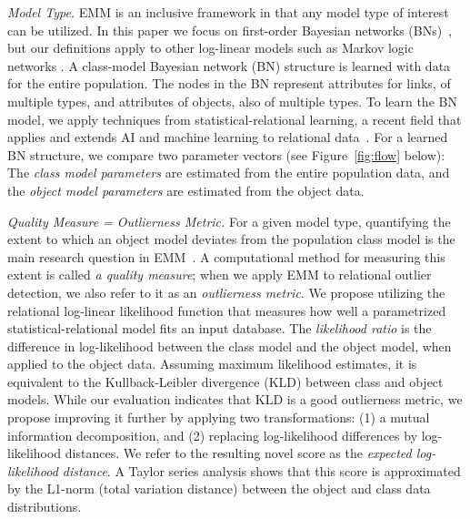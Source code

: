 {{\em Model Type.} EMM is an inclusive framework in that any model type of interest can be utilized. In this paper we focus on first-order Bayesian networks (BNs)~\cite{Wang2008,Poole2003,Kimmig2014}, but our definitions apply to other log-linear models such as Markov logic networks \cite{Domingos2007}. 
A class-model Bayesian network (BN) structure is learned with data for the entire population. The nodes in the BN represent attributes for links, of multiple types, and attributes of objects, also of multiple types. To learn the BN model, we apply techniques from statistical-relational learning, a  recent field that applies and extends AI and machine learning to relational data~\cite{SRL2007,Schulte2012,Domingos2009}. For a learned BN structure, we compare two parameter vectors (see Figure~\ref{fig:flow} below): The {\em class model parameters} are estimated from the entire population data, and the {\em object model parameters} are estimated from the object data. 

{\em Quality Measure = Outlierness Metric.} For a given model type, quantifying the extent to which an object model deviates from the population class model is the main research question in EMM~\cite{Duivesteijn2016}. A computational method for measuring this extent is called {\em a quality measure}; when we apply EMM to relational outlier detection, we also refer to it as an {\em outlierness metric}. We propose utilizing the relational log-linear likelihood function \cite{Kimmig2014,Schulte2011} that measures how well a parametrized statistical-relational model fits an input database. The {\em likelihood ratio} is the difference in log-likelihood between the class model and the object model, when applied to the object data. Assuming maximum likelihood estimates, it is equivalent to the Kullback-Leibler divergence (KLD) between class and object models. While our evaluation indicates that KLD is a good outlierness metric, we propose improving it further by applying two transformations: (1) a mutual information decomposition, and (2) replacing log-likelihood differences by log-likelihood distances. We refer to the resulting novel score as the {\em expected log-likelihood distance}. A Taylor series analysis shows that this score  is approximated by the L1-norm (total variation distance) between the object and class data distributions.


}
